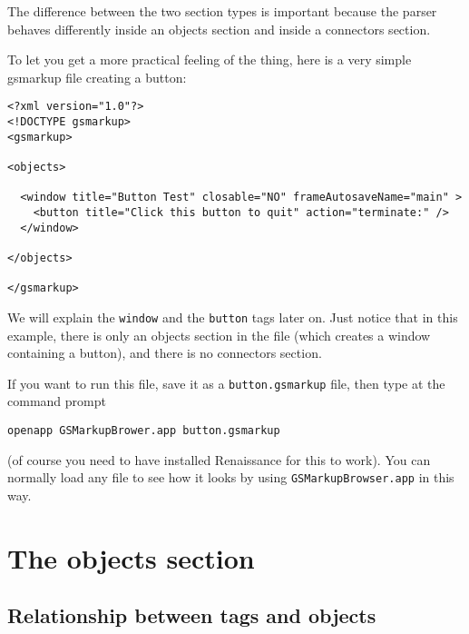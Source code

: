 The difference between the two section types is important because the
parser behaves differently inside an objects section and inside a
connectors section.

To let you get a more practical feeling of the thing, here is a very
simple gsmarkup file creating a button:
\begin{verbatim}
<?xml version="1.0"?>
<!DOCTYPE gsmarkup>
<gsmarkup>

<objects>

  <window title="Button Test" closable="NO" frameAutosaveName="main" >
    <button title="Click this button to quit" action="terminate:" />
  </window>

</objects>

</gsmarkup>
\end{verbatim}
We will explain the \texttt{window} and the \texttt{button} tags later
on.  Just notice that in this example, there is only an objects
section in the file (which creates a window containing a button), and
there is no connectors section.

If you want to run this file, save it as a \texttt{button.gsmarkup} file,
then type at the command prompt
\begin{verbatim}
openapp GSMarkupBrower.app button.gsmarkup
\end{verbatim}
(of course you need to have installed Renaissance for this to work).  You
can normally load any file to see how it looks by using
\texttt{GSMarkupBrowser.app} in this way.

\section{The objects section}

\subsection{Relationship between tags and objects}

